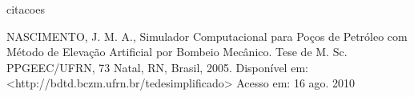 citacoes

NASCIMENTO, J. M. A., Simulador Computacional para Poços de Petróleo com
Método de Elevação Artificial por Bombeio Mecânico. Tese de M. Sc. PPGEEC/UFRN, 
73
Natal, RN, Brasil, 2005. Disponível em: <http://bdtd.bczm.ufrn.br/tedesimplificado>
Acesso em: 16 ago. 2010 